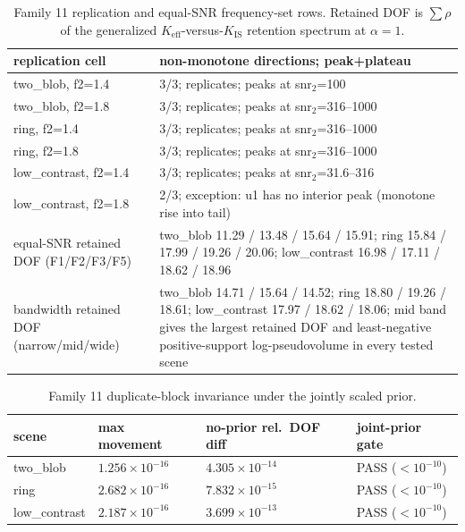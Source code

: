 \documentclass[12pt]{article}
\begin{document}
\begin{table}[htbp]
\centering
\small
\caption{Family 11 replication and equal-SNR frequency-set rows. Retained DOF
is $\sum\rho$ of the generalized $K_{\mathrm{eff}}$-versus-$K_{\mathrm{IS}}$
retention spectrum at $\alpha=1$.}
\label{tab:f11}
\begin{tabular}{p{} p{}}
\toprule
replication cell & non-monotone directions; peak+plateau \\
\midrule
two\_blob, f2=1.4 & 3/3; replicates; peaks at snr$_2$=100 \\
two\_blob, f2=1.8 & 3/3; replicates; peaks at snr$_2$=316--1000 \\
ring, f2=1.4 & 3/3; replicates; peaks at snr$_2$=316--1000 \\
ring, f2=1.8 & 3/3; replicates; peaks at snr$_2$=316--1000 \\
low\_contrast, f2=1.4 & 3/3; replicates; peaks at snr$_2$=31.6--316 \\
low\_contrast, f2=1.8 & 2/3; exception: u1 has no interior peak
(monotone rise into tail) \\
\midrule
equal-SNR retained DOF (F1/F2/F3/F5) &
two\_blob 11.29 / 13.48 / 15.64 / 15.91; ring 15.84 / 17.99 / 19.26 / 20.06;
low\_contrast 16.98 / 17.11 / 18.62 / 18.96 \\
\midrule
bandwidth retained DOF (narrow/mid/wide) &
two\_blob 14.71 / 15.64 / 14.52; ring 18.80 / 19.26 / 18.61;
low\_contrast 17.97 / 18.62 / 18.06; mid band gives the largest retained DOF
and least-negative positive-support log-pseudovolume in every tested scene \\
\bottomrule
\end{tabular}
\end{table}

\begin{table}[htbp]
\centering
\small
\caption{Family 11 duplicate-block invariance under the jointly scaled prior.}
\label{tab:f11dup}
\begin{tabular}{p{} p{} p{} p{}}
\toprule
scene & max movement & no-prior rel.\ DOF diff &
joint-prior gate \\
\midrule
two\_blob & $1.256\times10^{-16}$ & $4.305\times10^{-14}$ & PASS ($<10^{-10}$) \\
ring & $2.682\times10^{-16}$ & $7.832\times10^{-15}$ & PASS ($<10^{-10}$) \\
low\_contrast & $2.187\times10^{-16}$ & $3.699\times10^{-13}$ & PASS ($<10^{-10}$) \\
\bottomrule
\end{tabular}
\end{table}
\end{document}
